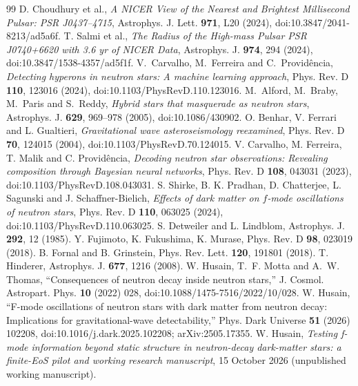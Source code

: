 \documentclass[11pt,a4paper]{article}
\begin{document}
\begin{thebibliography}{99}
 D. Choudhury et al., \emph{A NICER View of the Nearest and Brightest Millisecond Pulsar: PSR J0437--4715}, Astrophys. J. Lett. \textbf{971}, L20 (2024), doi:10.3847/2041-8213/ad5a6f.
 T. Salmi et al., \emph{The Radius of the High-mass Pulsar PSR J0740+6620 with 3.6 yr of NICER Data}, Astrophys. J. \textbf{974}, 294 (2024), doi:10.3847/1538-4357/ad5f1f.
 V.~Carvalho, M.~Ferreira and C.~Provid\^encia, \emph{Detecting hyperons in neutron stars: A machine learning approach}, Phys. Rev. D \textbf{110}, 123016 (2024), doi:10.1103/PhysRevD.110.123016.
 M.~Alford, M.~Braby, M.~Paris and S.~Reddy, \emph{Hybrid stars that masquerade as neutron stars}, Astrophys. J. \textbf{629}, 969--978 (2005), doi:10.1086/430902.
 O. Benhar, V. Ferrari and L. Gualtieri, \emph{Gravitational wave asteroseismology reexamined}, Phys. Rev. D \textbf{70}, 124015 (2004), doi:10.1103/PhysRevD.70.124015.
 V. Carvalho, M. Ferreira, T. Malik and C. Provid\^encia, \emph{Decoding neutron star observations: Revealing composition through Bayesian neural networks}, Phys. Rev. D \textbf{108}, 043031 (2023), doi:10.1103/PhysRevD.108.043031.
 S. Shirke, B. K. Pradhan, D. Chatterjee, L. Sagunski and J. Schaffner-Bielich, \emph{Effects of dark matter on $f$-mode oscillations of neutron stars}, Phys. Rev. D \textbf{110}, 063025 (2024), doi:10.1103/PhysRevD.110.063025.
 S. Detweiler and L. Lindblom, Astrophys. J. \textbf{292}, 12 (1985).
 Y. Fujimoto, K. Fukushima, K. Murase, Phys. Rev. D \textbf{98}, 023019 (2018).
 B. Fornal and B. Grinstein, Phys. Rev. Lett. \textbf{120}, 191801 (2018).
 T. Hinderer, Astrophys. J. \textbf{677}, 1216 (2008).
 W. Husain, T.~F. Motta and A.~W. Thomas, ``Consequences of neutron decay inside neutron stars,'' J. Cosmol. Astropart. Phys. \textbf{10} (2022) 028, doi:10.1088/1475-7516/2022/10/028.
 W. Husain, ``F-mode oscillations of neutron stars with dark matter from neutron decay: Implications for gravitational-wave detectability,'' Phys. Dark Universe \textbf{51} (2026) 102208, doi:10.1016/j.dark.2025.102208; arXiv:2505.17355.
 W. Husain, \emph{Testing f-mode information beyond static structure in neutron-decay dark-matter stars: a finite-EoS pilot and working research manuscript}, 15 October 2026 (unpublished working manuscript).

\end{thebibliography}
\end{document}
